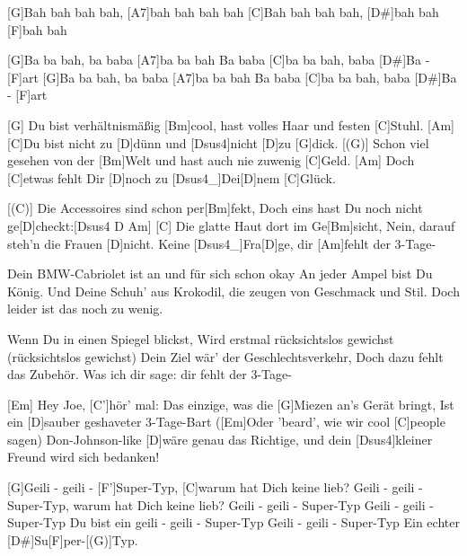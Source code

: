 
\chordscheme[%
	name = C',%
	finger = {1/2, 2/4, 3/5},%
	ring = {1, 3}]
\chordscheme[%
	name = F',%
	barre = {1/1-6},%
	finger = {2/3, 3/4, 3/5}]

\begin{guitar}
	[G]Bah bah bah bah, [A7]bah bah bah bah
	[C]Bah bah bah bah, [D#]bah bah [F]bah bah
	
	[G]Ba ba bah, ba baba [A7]ba ba bah
	Ba baba [C]ba ba bah, baba [D#]Ba - [F]art
	[G]Ba ba bah, ba baba [A7]ba ba bah
	Ba baba [C]ba ba bah, baba [D#]Ba - [F]art
	
	[G] Du bist verhältnismäßig [Bm]cool, hast volles Haar und festen [C]Stuhl. [Am]{}
	[C]Du bist nicht zu [D]dünn und [{\color{gray}Dsus4}]nicht [{\color{gray}D}]zu [G]dick.
	[(G)] Schon viel gesehen von der [Bm]Welt und hast auch nie zuwenig [C]Geld. [Am]{}
	Doch [C]etwas fehlt Dir [D]noch zu [{\color{gray}Dsus4}_]{Dei}[{\color{gray}D}]nem [C]Glück.
	
	[(C)] Die Accessoires sind schon per[Bm]fekt, 
	Doch eins hast Du noch nicht ge[D]checkt:[{\color{gray}Dsus4 D}  Am]{}
	[C] Die glatte Haut dort im Ge[Bm]sicht, 
	Nein, darauf steh'n die Frauen [D]nicht. Keine [{\color{gray}Dsus4}_]{Fra}[{\color{gray}D}]ge, dir [Am]fehlt der 3-Tage-
	
	 
	
	Dein BMW-Cabriolet ist an und für sich schon okay
	An jeder Ampel bist Du König.
	Und Deine Schuh' aus Krokodil, die zeugen von Geschmack und Stil.
	Doch leider ist das noch zu wenig.
	
	\pagebreak
	Wenn Du in einen Spiegel blickst,
	Wird erstmal rücksichtslos gewichst (rücksichtslos gewichst)
	Dein Ziel wär' der Geschlechtsverkehr,
	Doch dazu fehlt das Zubehör. Was ich dir sage: dir fehlt der 3-Tage-
	
	 
	
	[Em] Hey Joe, [C']hör' mal:
	Das einzige, was die [G]Miezen an's Gerät bringt,
	Ist ein [D]sauber geshaveter 3-Tage-Bart
	([Em]Oder 'beard', wie wir cool [C]people sagen)
	Don-Johnson-like [D]wäre genau das Richtige, 
	und dein [Dsus4]kleiner Freund wird sich bedanken!
	
	[G]Geili - geili - [F']Super-Typ, [C]warum hat Dich keine lieb?
	Geili - geili - Super-Typ, warum hat Dich keine lieb?
	Geili - geili - Super-Typ
	Geili - geili - Super-Typ
	Du bist ein geili - geili - Super-Typ
	Geili - geili - Super-Typ
	Ein echter [D#]Su[F]per-[(G)]Typ.
	
\end{guitar}